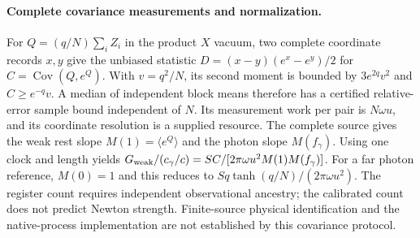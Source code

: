 \paragraph{Complete covariance measurements and normalization.}
For $Q=(q/N)\sum_i Z_i$ in the product $X$ vacuum, two complete coordinate
records $x,y$ give the unbiased statistic
$D=(x-y)(e^x-e^y)/2$ for $C=\operatorname{Cov}(Q,e^Q)$.
With $v=q^2/N$, its second moment is bounded by $3e^{2q}v^2$ and
$C\geq e^{-q}v$. A median of independent block means therefore has a
certified relative-error sample bound independent of $N$. Its measurement
work per pair is $N\omega u$, and its coordinate resolution is a supplied
resource. The complete source gives the weak rest slope
$M(1)=\langle e^Q\rangle$ and the photon slope $M(f_\gamma)$.
Using one clock and length yields
$G_{\rm weak}/(c_\gamma/c)=S C/[2\pi\omega u^2M(1)M(f_\gamma)]$.
For a far photon reference, $M(0)=1$ and this reduces to
$S q\tanh(q/N)/(2\pi\omega u^2)$.
The register count requires independent observational ancestry; the
calibrated count does not predict Newton strength. Finite-source physical
identification and the native-process implementation are not established
by this covariance protocol.
